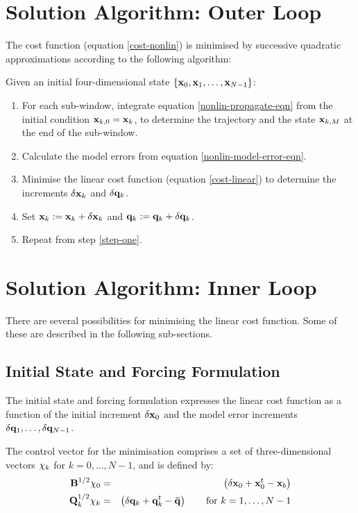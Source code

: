 \documentclass[12pt]{article}
\newcommand{\vect}[1]{{\bf #1}}                         %
\newcommand{\mat}[1]{{\bf #1}}                          %
\begin{document}
\section{Solution Algorithm: Outer Loop}

The cost function (equation \ref{cost-nonlin}) is minimised by successive
quadratic approximations according to the following algorithm:

Given an initial four-dimensional state
$\{ \vect{x}_0 , \vect{x}_1 , \ldots , \vect{x}_{N-1} \}$:
\begin{enumerate}
\item For each sub-window, integrate equation \ref{nonlin-propagate-eqn}
from the initial condition $\vect{x}_{k,0} = \vect{x}_k$, to determine
the trajectory and the state $\vect{x}_{k,M}$ at the end of the sub-window.
\label{step-one}

\item Calculate the model errors from equation \ref{nonlin-model-error-eqn}.

\item Minimise the linear cost function (equation \ref{cost-linear})
to determine the increments $\delta\vect{x}_k$ and $\delta\vect{q}_k$.

\item Set $\vect{x}_k:=\vect{x}_k + \delta\vect{x}_k$ and
          $\vect{q}_k:=\vect{q}_k + \delta\vect{q}_k$.
\item Repeat from step \ref{step-one}.
\end{enumerate}

\section{Solution Algorithm: Inner Loop}

There are several possibilities for minimising the linear cost function.
Some of these are described in the following sub-sections.

\subsection{Initial State and Forcing Formulation}
The initial state and forcing formulation expresses the linear cost
function as a function of the initial increment $\delta\vect{x}_0$ and
the model error increments $\delta\vect{q}_1 , \ldots , \delta\vect{q}_{N-1}$.

The control vector for the minimisation comprises a set of three-dimensional
vectors $\vect{\chi}_k$ for $k=0, \ldots , N-1$, and is defined by:
\begin{eqnarray}
  \label{psi-to-dx0-eqn}
  \mat{B}^{1/2} \vect{\chi}_0  &=& 
     \left( \delta\vect{x}_0 + \vect{x}^t_0 - \vect{x}_b \right) \\
  \label{psi-to-dq-eqn}
  \mat{Q}_k^{1/2} \vect{\chi}_k  &=& 
     \left( \delta\vect{q}_k + \vect{q}^t_k - \vect{\bar q}  \right)
     \qquad \mbox{for $k=1, \ldots , N-1$}
\end{eqnarray}
\end{document}
